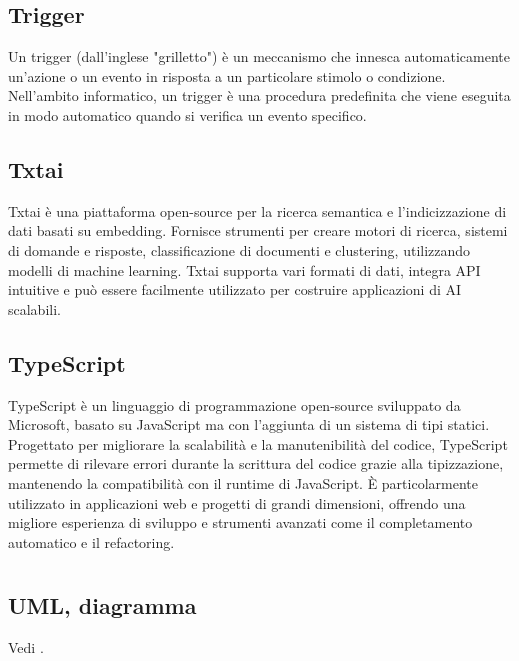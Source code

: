 \hypertarget{sec:trigger}{}
\subsection*{Trigger}
Un trigger (dall'inglese "grilletto") è un meccanismo che innesca automaticamente un'azione o un evento in risposta a un particolare 
stimolo o condizione. Nell'ambito informatico, un trigger è una procedura predefinita che viene eseguita in modo automatico quando 
si verifica un evento specifico.

\hypertarget{sec:txtai}{}
\subsection*{Txtai}
Txtai è una piattaforma open-source per la ricerca semantica e l'indicizzazione di dati basati su embedding. Fornisce strumenti per creare motori di 
ricerca, sistemi di domande e risposte, classificazione di documenti e clustering, utilizzando modelli di machine learning. Txtai supporta vari formati 
di dati, integra API intuitive e può essere facilmente utilizzato per costruire applicazioni di AI scalabili.

\hypertarget{sec:typescript}{}
\subsection*{TypeScript}
TypeScript è un linguaggio di programmazione open-source sviluppato da Microsoft, basato su JavaScript ma con l'aggiunta di un sistema di tipi statici. 
Progettato per migliorare la scalabilità e la manutenibilità del codice, TypeScript permette di rilevare errori durante la scrittura del codice grazie 
alla tipizzazione, mantenendo la compatibilità con il runtime di JavaScript. È particolarmente utilizzato in applicazioni web e progetti di grandi 
dimensioni, offrendo una migliore esperienza di sviluppo e strumenti avanzati come il completamento automatico e il refactoring.

\newpage



\section{}

\hypertarget{sec:uml}{}
\subsection*{UML, diagramma}
Vedi .

